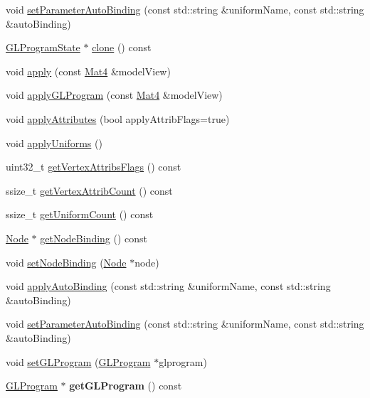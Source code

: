 \begin{DoxyCompactItemize}
\item 
void \hyperlink{classGLProgramState_adabf77e7268bff9186c1009c3625f983}{set\+Parameter\+Auto\+Binding} (const std\+::string \&uniform\+Name, const std\+::string \&auto\+Binding)
\item 
\hyperlink{classGLProgramState}{G\+L\+Program\+State} $\ast$ \hyperlink{classGLProgramState_adead71e82d66f5d93b73871f3766eb7a}{clone} () const
\item 
void \hyperlink{classGLProgramState_a3bd47e0176e61945893c4227cf50dc8d}{apply} (const \hyperlink{classMat4}{Mat4} \&model\+View)
\item 
void \hyperlink{classGLProgramState_a2caeee298087f126c4460752a6f42bc5}{apply\+G\+L\+Program} (const \hyperlink{classMat4}{Mat4} \&model\+View)
\item 
void \hyperlink{classGLProgramState_af524cc2e3b621997336d5b58f221c624}{apply\+Attributes} (bool apply\+Attrib\+Flags=true)
\item 
void \hyperlink{classGLProgramState_ac673949ce3b48aa2a31ad2457bfa5a2c}{apply\+Uniforms} ()
\item 
uint32\+\_\+t \hyperlink{classGLProgramState_a05e1e9950fe6200b8ca7819e8f5e1271}{get\+Vertex\+Attribs\+Flags} () const
\item 
ssize\+\_\+t \hyperlink{classGLProgramState_af106445181df4e066f599418232e6b7e}{get\+Vertex\+Attrib\+Count} () const
\item 
ssize\+\_\+t \hyperlink{classGLProgramState_abdad543ece51ec3b98ff59d4bc4e75f6}{get\+Uniform\+Count} () const
\item 
\hyperlink{classNode}{Node} $\ast$ \hyperlink{classGLProgramState_adb2c99ca62dc93dff303d665e57557ad}{get\+Node\+Binding} () const
\item 
void \hyperlink{classGLProgramState_a4d96305b053c642b99d4e97ea17f7f21}{set\+Node\+Binding} (\hyperlink{classNode}{Node} $\ast$node)
\item 
void \hyperlink{classGLProgramState_a495c04e63419504e616bae7795bf0af9}{apply\+Auto\+Binding} (const std\+::string \&uniform\+Name, const std\+::string \&auto\+Binding)
\item 
void \hyperlink{classGLProgramState_adabf77e7268bff9186c1009c3625f983}{set\+Parameter\+Auto\+Binding} (const std\+::string \&uniform\+Name, const std\+::string \&auto\+Binding)
\end{DoxyCompactItemize}
\textbf{ }\par
\begin{DoxyCompactItemize}
\item 
void \hyperlink{classGLProgramState_a38a364bb0ad6f5ccae97e689dd02011e}{set\+G\+L\+Program} (\hyperlink{classGLProgram}{G\+L\+Program} $\ast$glprogram)
\item 
\mbox{\label{classGLProgramState_a1b6d4947980d7b82313a9a6e0d6894c2}} 
\hyperlink{classGLProgram}{G\+L\+Program} $\ast$ {\bfseries get\+G\+L\+Program} () const
\end{DoxyCompactItemize}

